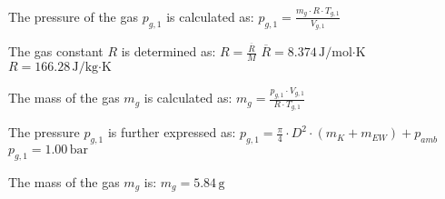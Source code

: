The pressure of the gas \( p_{g,1} \) is calculated as:  
\( p_{g,1} = \frac{m_g \cdot R \cdot T_{g,1}}{V_{g,1}} \)  

The gas constant \( R \) is determined as:  
\( R = \frac{\overline{R}}{M} \)  
\( \overline{R} = 8.374 \, \text{J/mol·K} \)  
\( R = 166.28 \, \text{J/kg·K} \)  

The mass of the gas \( m_g \) is calculated as:  
\( m_g = \frac{p_{g,1} \cdot V_{g,1}}{R \cdot T_{g,1}} \)  

The pressure \( p_{g,1} \) is further expressed as:  
\( p_{g,1} = \frac{\pi}{4} \cdot D^2 \cdot (m_K + m_{EW}) + p_{amb} \)  
\( p_{g,1} = 1.00 \, \text{bar} \)  

The mass of the gas \( m_g \) is:  
\( m_g = 5.84 \, \text{g} \)